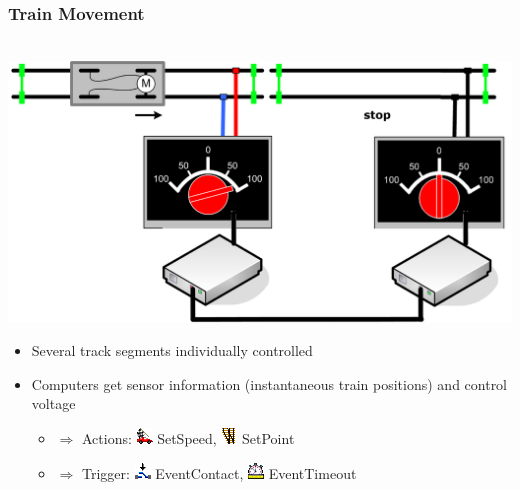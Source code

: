 
\begin{frame}
  \frametitle{Train Movement}
\hspace{1.5cm}~\includegraphics[scale=0.09]{images/segment-trains3.png}
\begin{itemize}
  \item Several track segments individually controlled 
  \pause
  \item Computers get sensor information (instantaneous train positions) and control voltage
  \pause
	\begin{itemize}
		  \item $\Rightarrow$ Actions: \includegraphics[scale=0.8]{images/SetSpeed.png} SetSpeed, \includegraphics[scale=0.8]{images/SetPoint.png} SetPoint
		  \item $\Rightarrow$ Trigger: \includegraphics[scale=0.8]{images/EventContact.png} EventContact, \includegraphics[scale=0.8]{images/EventWait.png} EventTimeout
	\end{itemize}
\end{itemize}
  \end{frame}



